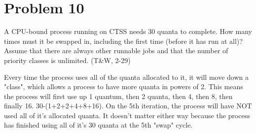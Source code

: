 \documentclass[11pt]{article}
\begin{document}
\section*{Problem 10}
A CPU-bound process running on CTSS needs 30 quanta to complete. How many times must it be swapped in, including the first time (before it has run at all)? Assume that there are always other runnable jobs and that the number of priority classes is unlimited. (T\&W, 2-29)

Every time the process uses all of the quanta allocated to it, it will move down a "class", which allows a process to have more quanta in powers of 2. This means the process will first use up 1 quantum, then 2 quanta, then 4, then 8, then finally 16. 30-(1+2+2+4+8+16). On the 5th iteration, the process will have NOT used all of it's allocated quanta. It doesn't matter either way because the process has finished using all of it's 30 quanta at the 5th "swap" cycle. 
\end{document}
